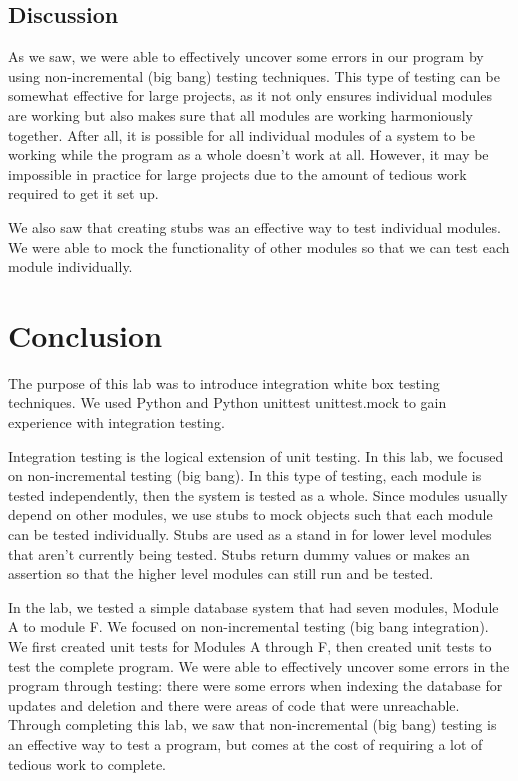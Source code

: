 \documentclass[12pt, letterpaper, titlepage]{article}
\begin{document}
\subsection*{Discussion}
As we saw, we were able to effectively uncover some errors in our program by using non-incremental (big bang) testing techniques. This type of testing can be somewhat effective for large projects, as it not only ensures individual modules are working but also makes sure that all modules are working harmoniously together. After all, it is possible for all individual modules of a system to be working while the program as a whole doesn't work at all. However, it may be impossible in practice for large projects due to the amount of tedious work required to get it set up. 

We also saw that creating stubs was an effective way to test individual modules. We were able to mock the functionality of other modules so that we can test each module individually. 

\section*{Conclusion}
The purpose of this lab was to introduce integration white box testing techniques. We used Python and Python unittest unittest.mock to gain experience with integration testing.

Integration testing is the logical extension of unit testing. In this lab, we focused on non-incremental testing (big bang). In this type of testing, each module is tested independently, then the system is tested as a whole. Since modules usually depend on other modules, we use stubs to mock objects such that each module can be tested individually. Stubs are used as a stand in for lower level modules that aren't currently being tested. Stubs return dummy values or makes an assertion so that the higher level modules can still run and be tested. 

In the lab, we tested a simple database system that had seven modules, Module A to module F. We focused on non-incremental testing (big bang integration). We first created unit tests for Modules A through F, then created unit tests to test the complete program. We were able to effectively uncover some errors in the program through testing: there were some errors when indexing the database for updates and deletion and there were areas of code that were unreachable. Through completing this lab, we saw that non-incremental (big bang) testing is an effective way to test a program, but comes at the cost of requiring a lot of tedious work to complete. 
\end{document}
